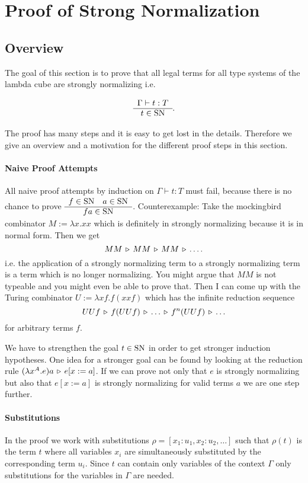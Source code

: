 \section{Proof of Strong Normalization}

\subsection{Overview}

The goal of this section is to prove that all legal terms for all type systems
of the lambda cube are strongly normalizing i.e.

$$
\begin{array}{c} \Gamma \vdash t: T \\ \hline t \in \text{SN}\end{array}.
$$

The proof has many steps and it is easy to get lost in the details. Therefore
we give an overview and a motivation for the different proof steps in this
section.

\paragraph{Naive Proof Attempts}
All naive proof attempts by induction on $\Gamma \vdash t: T$ must fail,
because there is no chance to prove
$\begin{array}{c} f \in \text{SN} \quad a \in \text{SN} \\ \hline f a \in \text{SN}\end{array}$. Counterexample: Take the
mockingbird combinator $M := \lambda x. x x$ which is definitely in strongly
normalizing because it is in normal form. Then we get
$$
  M M \,\triangleright\, M M \,\triangleright\, M M \,\triangleright\, \ldots.
$$
i.e. the application of a strongly normalizing term to a strongly normalizing
term is a term which is no longer normalizing. You might argue that $M M$ is
not typeable and you might even be able to prove that. Then I can come up with
the Turing combinator $U := \lambda x f . f (x x f)$ which has the infinite
reduction sequence
$$
 U U f \,\triangleright\, f (U U f) \,\triangleright\, \ldots \,\triangleright\, f^n (U U f) \,\triangleright\, \ldots
$$
for arbitrary terms $f$.

We have to strengthen the goal $t \in \text{SN}$ in order to get stronger induction
hypotheses. One idea for a stronger goal can be found by looking at the
reduction rule $(\lambda x^A. e) a \,\triangleright\, e[x:=a]$. If we can prove not only
that $e$ is strongly normalizing but also that $e[x:=a]$ is strongly
normalizing for valid terms $a$ we are one step further.


\paragraph{Substitutions}
In the proof we work with substitutions $\rho = [x_1:u_1, x_2:u_2, \ldots]$
such that $\rho(t)$ is the term $t$ where all variables $x_i$ are
simultaneously substituted by the corresponding term $u_i$. Since $t$ can
contain only variables of the context $\Gamma$ only substitutions for the
variables in $\Gamma$ are needed.

